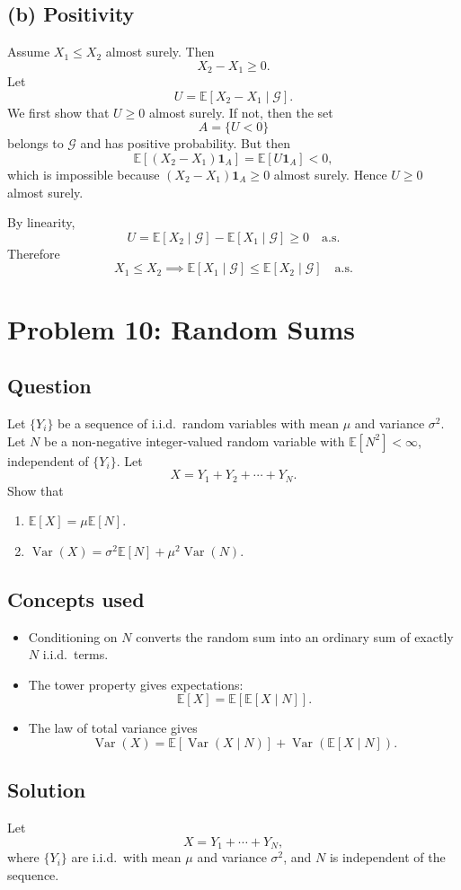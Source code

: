 \documentclass[11pt,a4paper]{article}
\newcommand{\E}{\mathbb{E}}
\newcommand{\Var}{\operatorname{Var}}
\newcommand{\1}{\mathbf{1}}
\newcommand{\cG}{\mathcal{G}}
\begin{document}
\subsection*{(b) Positivity}
Assume $X_1\le X_2$ almost surely. Then
\[
X_2-X_1\ge 0.
\]
Let
\[
U=\E[X_2-X_1\mid \cG].
\]
We first show that $U\ge 0$ almost surely. If not, then the set
\[
A=\{U<0\}
\]
belongs to $\cG$ and has positive probability. But then
\[
\E[(X_2-X_1)\1_A]
=\E[U\1_A]
<0,
\]
which is impossible because $(X_2-X_1)\1_A\ge 0$ almost surely. Hence $U\ge 0$ almost surely.

By linearity,
\[
U=\E[X_2\mid \cG]-\E[X_1\mid \cG]\ge 0\quad \text{a.s.}
\]
Therefore
\[
\boxed{X_1\le X_2\implies \E[X_1\mid \cG]\le \E[X_2\mid \cG]\quad \text{a.s.}}
\]

\section{Problem 10: Random Sums}
\subsection*{Question}
Let $\{Y_i\}$ be a sequence of i.i.d.\ random variables with mean $\mu$ and variance $\sigma^2$. Let $N$ be a non-negative integer-valued random variable with $\E[N^2]<\infty$, independent of $\{Y_i\}$. Let
\[
X=Y_1+Y_2+\cdots+Y_N.
\]
Show that
\begin{enumerate}[label=\textbf{(\alph*)}]
  \item $\E[X]=\mu \E[N]$.
  \item $\Var(X)=\sigma^2\E[N]+\mu^2\Var(N)$.
\end{enumerate}

\subsection*{Concepts used}
\begin{itemize}
  \item Conditioning on $N$ converts the random sum into an ordinary sum of exactly $N$ i.i.d.\ terms.
  \item The tower property gives expectations:
  \[
  \E[X]=\E[\E[X\mid N]].
  \]
  \item The law of total variance gives
  \[
  \Var(X)=\E[\Var(X\mid N)]+\Var(\E[X\mid N]).
  \]
\end{itemize}

\subsection*{Solution}
Let
\[
X=Y_1+\cdots+Y_N,
\]
where $\{Y_i\}$ are i.i.d.\ with mean $\mu$ and variance $\sigma^2$, and $N$ is independent of the sequence.
\end{document}
